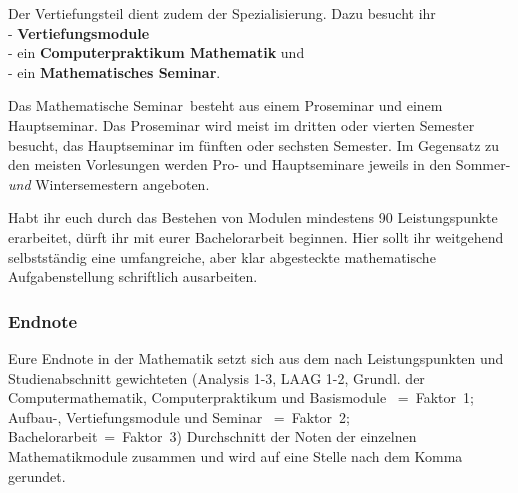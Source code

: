 Der Vertiefungsteil dient zudem der Spezialisierung.
Dazu besucht ihr\\
  - {\bf Vertiefungsmodule}\\
  - ein {\bf Computerpraktikum Mathematik} und\\
  - ein {\bf Mathematisches Seminar}.

Das \glqq Mathematische Seminar\grqq\ 
besteht aus einem Proseminar und einem Hauptseminar.
Das Proseminar wird meist im dritten oder vierten Semester besucht,
das Hauptseminar im fünften oder sechsten Semester.
Im Gegensatz zu den meisten Vorlesungen
werden Pro- und Hauptseminare jeweils
in den Sommer- {\it und} Wintersemestern angeboten.

Habt ihr euch durch das Bestehen von Modulen
mindestens 90 Leistungspunkte erarbeitet,
dürft ihr mit eurer Bachelorarbeit beginnen.
Hier sollt ihr weitgehend selbstständig
eine umfangreiche, aber klar abgesteckte
mathematische Aufgabenstellung schriftlich ausarbeiten.

\subsubsection{Endnote}

Eure Endnote in der Mathematik
setzt sich aus dem nach Leistungspunkten
und Studienabschnitt gewichteten (Analysis 1-3, LAAG 1-2,
Grundl. der Computermathematik, Computerpraktikum und Basismodule ~=~Faktor~1; \\
Aufbau-, Vertiefungsmodule und Seminar ~=~Faktor~2; Bachelorarbeit~=~Faktor~3)
Durchschnitt der Noten der einzelnen Mathematikmodule zusammen
und wird auf eine Stelle nach dem Komma gerundet.


